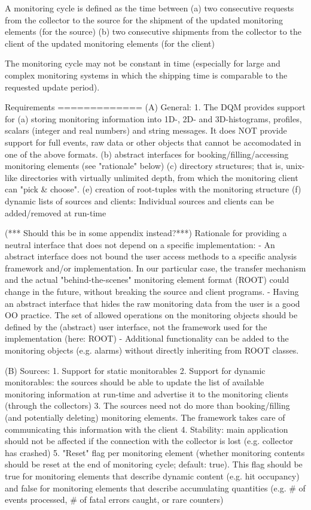 A monitoring cycle is defined as the time between
(a) two consecutive requests from the collector to the source for the shipment
of the updated monitoring elements (for the source) 
(b) two consecutive shipments from the collector to the client of the
updated monitoring elements (for the client)

The monitoring cycle may not be constant in time (especially for large
and complex monitoring systems in which the shipping time is
comparable to the requested update period). 

Requirements
=============
(A) General:
1. The DQM provides support for 
(a) storing monitoring information into 1D-, 2D- and 3D-histograms,
profiles, scalars (integer and real numbers) and string messages. It
does NOT provide support for full events, raw data or other objects
that cannot be accomodated in one of the above formats. 
(b) abstract interfaces for booking/filling/accessing monitoring
elements (see "rationale" below)
(c) directory structures; that is, unix-like directories with
virtually unlimited depth, from which the monitoring client can "pick
& choose". 
(e) creation of root-tuples with the monitoring structure
(f) dynamic lists of sources and clients: Individual sources and
clients can be added/removed at run-time

(*** Should this be in some appendix instead?***)
Rationale for providing a neutral interface that does not depend on a specific
implementation:
- An abstract interface does not bound the user access methods to a
specific analysis framework and/or implementation. In our particular
case, the transfer mechanism and the actual "behind-the-scenes"
monitoring element format (ROOT) could change in the future, without
breaking the source and client programs.
- Having an abstract interface that hides the raw monitoring data from
the user is a good OO practice. The set of allowed operations on the
monitoring objects should be defined by the (abstract) user interface,
not the framework used for the implementation (here: ROOT)
- Additional functionality can be added to the monitoring objects
(e.g. alarms) without directly inheriting from ROOT classes.

(B) Sources:
1. Support for static monitorables
2. Support for dynamic monitorables: the sources should be able to
update the list of available monitoring information at run-time and
advertise it to the monitoring clients (through the collectors)
3. The sources need not do more than booking/filling (and potentially
deleting) monitoring elements. The framework takes care of
communicating this information with the client
4. Stability: main application should not be affected if the connection
with the collector is lost (e.g. collector has crashed)
5. "Reset" flag per monitoring element (whether monitoring
contents should be reset at the end of monitoring cycle; default: true). 
This flag should be true for monitoring elements that describe dynamic
content (e.g. hit occupancy) and false for monitoring elements that
describe accumulating quantities (e.g. # of events processed, # of
fatal errors caught, or rare counters)

